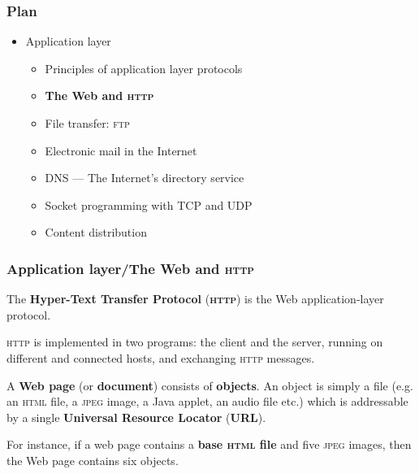 
%
\begin{frame}
\frametitle{Plan}

\begin{itemize}

  \item Application layer

  \begin{itemize}

    \item Principles of application layer protocols

    \item \textbf{The Web and \textsc{http}}

    \item File transfer: \textsc{ftp}

    \item Electronic mail in the Internet

    \item DNS --- The Internet's directory service

    \item Socket programming with TCP and UDP

    \item Content distribution

  \end{itemize}

\end{itemize}

\end{frame}


%
\begin{frame}
\frametitle{Application layer/The Web and \textsc{http}}

The \textbf{Hyper-Text Transfer Protocol} (\textbf{\textsc{http}}) is
the Web application-layer protocol.

\bigskip

\textsc{http} is implemented in two programs: the client and the
server, running on different and connected hosts, and exchanging
\textsc{http} messages.

\bigskip

A \textbf{Web page} (or \textbf{document}) consists of
\textbf{objects}. An object is simply a file (e.g. an \textsc{html}
file, a \textsc{jpeg} image, a \textsf{Java} applet, an audio file
etc.) which is addressable by a single \textbf{Universal Resource
Locator} (\textbf{URL}).

\bigskip

For instance, if a web page contains a \textbf{base \textsc{html}
file} and five \textsc{jpeg} images, then the Web page contains six
objects.

\end{frame}

